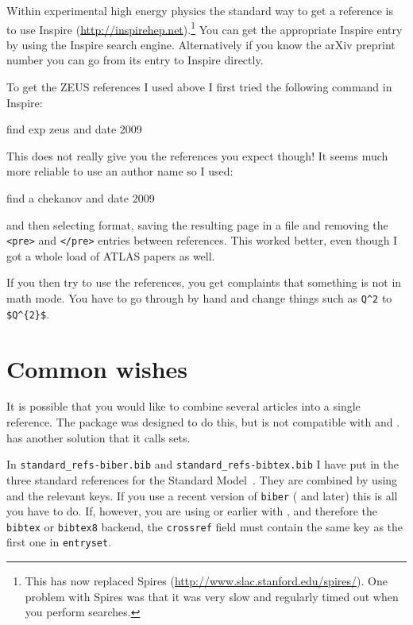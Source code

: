 Within experimental high energy physics the standard way to get a
reference is to use Inspire
(\url{http://inspirehep.net}).\footnote{This has now replaced Spires
(\url{http://www.slac.stanford.edu/spires/}).
One problem with Spires was that it was very slow and regularly
timed out when you perform searches.} You can get the appropriate
Inspire entry by using the Inspire search engine. Alternatively if you
know the arXiv preprint number you can go from its entry to Inspire
directly.

To get the ZEUS references I used above I first tried the following
command in Inspire:
\begin{bashlisting}
find exp zeus and date 2009
\end{bashlisting}
This does not really give you the references you expect though! It
seems much more reliable to use an author name so I used:
\begin{bashlisting}
find a chekanov and date 2009
\end{bashlisting}
and then selecting \BibTeX{} format, saving the resulting page in a file
and removing the \texttt{<pre>} and \texttt{</pre>} entries between
references. This worked better, even though I got a whole load of
ATLAS papers as well.

If you then try to use the references, you get complaints that
something is not in math mode. You have to go through by hand and
change things such as \verb+Q^2+ to \verb+$Q^{2}$+.


\section{Common wishes}%
\label{sec:ref:tips}

It is possible that you would like to combine several articles into a
single reference. The  package was designed to do this,
but is not compatible with  and
.  has another solution that it
calls sets.

In \texttt{standard\_refs-biber.bib} and
\texttt{standard\_refs-bibtex.bib} I have put in the three standard
references for the Standard Model~\cite{gsw}. They are combined by
using  and the relevant
keys. If you use a recent version of \texttt{biber} ( and later)
this is all you have to do.  If, however, you are using  or earlier with , and therefore the \texttt{bibtex} or \texttt{bibtex8} backend, the
\texttt{crossref} field must contain the same key as the first one in
\texttt{entryset}.

